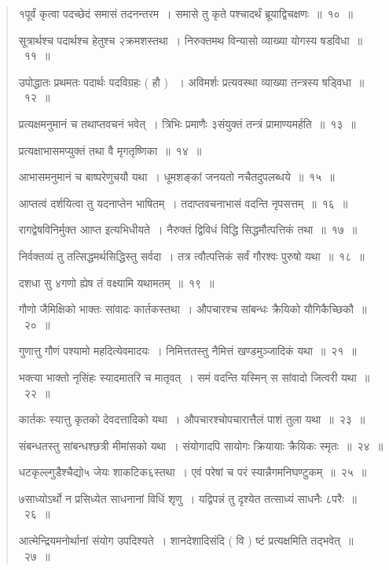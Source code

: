 \documentclass[11pt, openany]{book}
\makeatletter
\newcommand{\devanagarinumeral}[1]{
\devanagaridigits{\number \csname c@#1\endcsname}} %
\makeatother
\begin{document}
\fancyhead[RE,LO]{[ १ अ. १ पा. १ आह्निके}
\fancyhead[CE,CO]{\thepage}
\cfoot{}
\newpage
\renewcommand{\thepage}{\devanagarinumeral{page}}
\setcounter{page}{2}


\begin{quote}
{\mbh १पूर्वं कृत्वा पदच्छेदं समासं तदनन्तरम~। समासे तु कृते पश्चादर्थं ब्रूयाद्विचक्षणः~॥~१०~॥

सूत्रार्थश्च पदार्थश्च हेतुश्च २क्रमशस्तथा~। निरुक्तमथ विन्यासो व्याख्या योगस्य षडविधा~॥~११~॥

उपोद्धातः प्रथमतः पदार्थः पदविग्रहः ( हौ ) ~। अविमर्शः प्रत्यवस्था व्याख्या तन्त्रस्य षड्विधा~॥~१२~॥

प्रत्यक्षमनुमानं च तथाप्तवचनं भवेत्~। त्रिभिः प्रमाणैः ३संयुक्तं तन्त्रं प्रामाण्यमर्हति~॥~१३~॥

प्रत्यक्षाभासमप्युक्तं तथा वै मृगतृष्णिका~॥~१४~॥

आभासमनुमानं च बाष्परेणुचयौ यथा~। धूमशङ्कां जनयतो नचैतदुपलब्धये~॥~१५~॥

आप्तत्वं दर्शयित्वा तु यदनाप्तेन भाषितम्~। तदाप्तवचनाभासं वदन्ति नृपसत्तम्~॥~१६~॥

रागद्वेषविनिर्मुक्त आाप्त इत्यभिधीयते~। नैरुक्तं द्विविधं विद्धि सिद्धमौत्पत्तिकं तथा~॥~१७~॥

निर्वक्तव्यं तु तत्सिद्धमर्थसिद्धिस्तु सर्वदा~। तत्र त्वौत्पत्तिकं सर्वं गौरश्वः पुरुषो यथा~॥~१८~॥

दशधा सु ४गणो ह्येष तं वक्ष्यामि यथामतम्~॥~१९~॥

गौणो जैमिक्षिको भाक्तः सांवादः कार्तकस्तथा~। औपचारश्च सांबन्धः क्रैयिको यौगिकैच्छिकौ~॥~२०~॥

गुणात्तु गौणं पश्यामो महदित्येवमादयः~। निमित्ततस्तु नैमित्तं खण्डमुञ्जादिकं यथा~॥~२१~॥

भक्त्या भाक्तो नृसिंहः स्यादमातरि च मातृवत्~। समं वदन्ति यस्मिन् स सांवादो जित्वरी यथा~॥~२२~॥

कार्तकः स्यात्तु कृतको देवदत्तादिको यथा~। औपचारश्चोपचारात्तैलं पाशं तुला यथा~॥~२३~॥

संबन्धतस्तु सांबन्धश्छत्री मीमांसको यथा~। संयोगादपि सायोगः क्रियायाः क्रैयिकः स्मृतः~॥~२४~॥

धटकृल्ल्गुडैश्चैद्यो५ जेयः शाकटिक६स्तथा~। एवं परेषां च परं स्यान्नैगमनिघण्टुकम्~॥~२५~॥

७साध्योऽर्थो न प्रसिध्येत साधनानां विधिं शृणु~। यद्विपन्नं तु दृश्येत तत्साध्यं साधनैः ८परैः~॥~२६~॥

आत्मेन्द्रियमनोर्थानां संयोग उपदिश्यते~। शानदेशादिसंदि ( वि ) ष्टं प्रत्यक्षमिति तद्भवेत्~॥~२७~॥

}
\end{quote}
\end{document}
